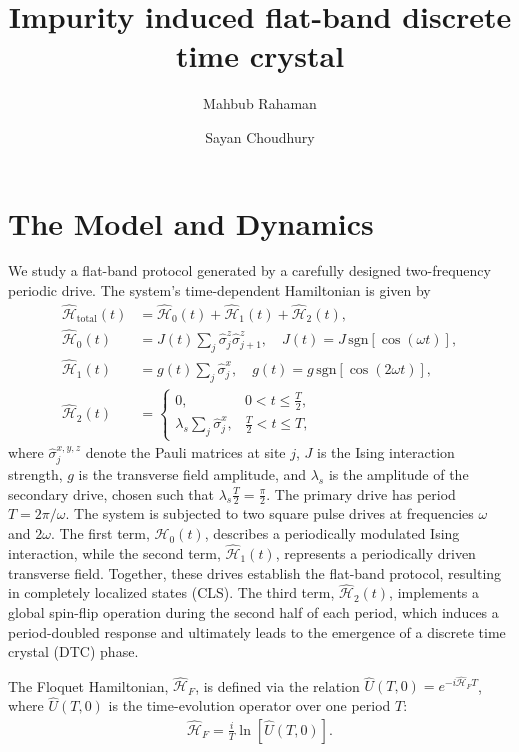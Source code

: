 \documentclass[a4paper, 10pt]{article}
\title{Impurity induced flat-band discrete time crystal}
\author[1]{Mahbub Rahaman}
\author[1]{Sayan Choudhury}
\affil[1]{\small Harish-Chandra Research Institute, HBNI, Chhatnag Road, Jhunsi, Praygraj, UP - 211019, India}
\date{}
\begin{document}
\maketitle

\section{The Model and Dynamics}
We study a flat-band protocol generated by a carefully designed two-frequency periodic drive. The system’s time-dependent Hamiltonian is given by
\begin{align}
    \hat{\mathcal{H}}_{\text{total}}(t) &=  \hat{\mathcal{H}}_0(t) + \hat{\mathcal{H}}_1(t)  + \hat{\mathcal{H}}_2(t), \\
    \hat{\mathcal{H}}_0(t) &= J(t)\sum_{j} \hat{\sigma}_j^z \hat{\sigma}_{j+1}^z, \quad J(t) = J\, \mathrm{sgn}[\cos(\omega t)], \\
    \hat{\mathcal{H}}_1(t) &= g(t)\sum_{j}\hat{\sigma}_j^x, \quad g(t) = g\, \mathrm{sgn}[\cos(2 \omega t)], \\
    \hat{\mathcal{H}}_2(t) &=
    \begin{cases}
        0, & 0 < t \leq \frac{T}{2}, \\
        \lambda_s \sum_{j}\hat{\sigma}_j^x, & \frac{T}{2} < t \leq T,
    \end{cases}
\end{align}
where $\hat{\sigma}_j^{x,y,z}$ denote the Pauli matrices at site $j$, $J$ is the Ising interaction strength, $g$ is the transverse field amplitude, and $\lambda_s$ is the amplitude of the secondary drive, chosen such that $\lambda_s \frac{T}{2} = \frac{\pi}{2}$. The primary drive has period $T = 2\pi/\omega$. The system is subjected to two square pulse drives at frequencies $\omega$ and $2\omega$. The first term, $\hat{\mathcal{H}}_0(t)$, describes a periodically modulated Ising interaction, while the second term, $\hat{\mathcal{H}}_1(t)$, represents a periodically driven transverse field. Together, these drives establish the flat-band protocol, resulting in completely localized states (CLS). The third term, $\hat{\mathcal{H}}_2(t)$, implements a global spin-flip operation during the second half of each period, which induces a period-doubled response and ultimately leads to the emergence of a discrete time crystal (DTC) phase.

The Floquet Hamiltonian, $\hat{\mathcal{H}}_F$, is defined via the relation $\hat{U}(T,0) = e^{-i \hat{\mathcal{H}}_F T}$, where $\hat{U}(T,0)$ is the time-evolution operator over one period $T$:
\begin{align}
    \hat{\mathcal{H}}_F = \frac{i}{T} \ln[\hat{U}(T,0)].
\end{align}
\end{document}
